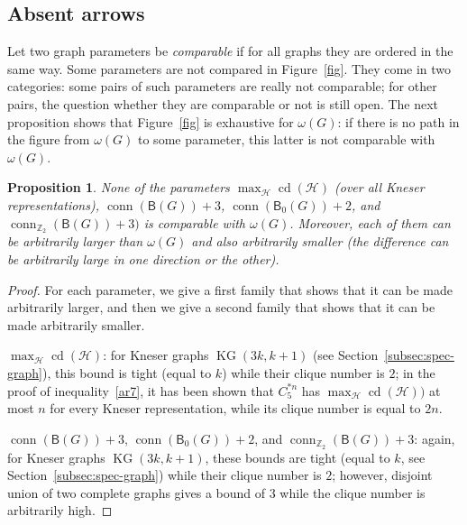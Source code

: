 \documentclass[12pt]{amsart}
\newtheorem{proposition}[theorem]{Proposition}
\theoremstyle{definition}
\def\Z{\mathbb{Z}}
\def\HH{\mathcal{H}}
\def\B{\mathsf{B}}
\def\KG{\operatorname{KG}}
\def\conn{\operatorname{conn}}
\def\cd{\operatorname{cd}}
\begin{document}
\subsection{Absent arrows}

Let two graph parameters be {\em comparable} if for all graphs they are ordered in the same way. Some parameters are not compared in Figure~\ref{fig}. They come in two categories: some pairs of such parameters are really not comparable; for other pairs, the question whether they are comparable or not is still open. The next proposition shows that Figure~\ref{fig} is exhaustive for $\omega(G)$: if there is no path in the figure from $\omega(G)$ to some parameter, this latter is not comparable with $\omega(G)$.

\begin{proposition}\label{prop:uncomp}
None of the parameters $\max_{\HH}\cd(\HH)$ (over all Kneser representations), $\conn(\B(G))+3$, $\conn(\B_0(G))+2$, and $\conn_{\Z_2}(\B(G))+3)$ is comparable with $\omega(G)$. Moreover, each of them can be 
arbitrarily larger than $\omega(G)$ and also arbitrarily smaller (the difference can be arbitrarily large in one direction or the other).
\end{proposition}

\begin{proof} For each parameter, we give a first family that shows that it can be made arbitrarily larger, and then we give a second family that shows that it can be made arbitrarily smaller.

$\max_{\HH}\cd(\HH)$: for Kneser graphs $\KG(3k,k+1)$ (see Section~\ref{subsec:spec-graph}), this bound is tight (equal to $k$) while their clique number is $2$; in the proof of inequality~\eqref{ar7}, it has been shown that $C_5^{*n}$ has $\max_{\HH}\cd(\HH))$ at most $n$ for every Kneser representation, while its clique number is equal to $2n$.


$\conn(\B(G))+3$, $\conn(\B_0(G))+2$, and $\conn_{\Z_2}(\B(G))+3$: again, for Kneser graphs $\KG(3k,k+1)$, these bounds are tight (equal to $k$, see Section~\ref{subsec:spec-graph}) while their clique number is $2$; however, disjoint union of two complete graphs gives a bound of $3$ while the clique number is arbitrarily high.
\end{proof}
\end{document}
